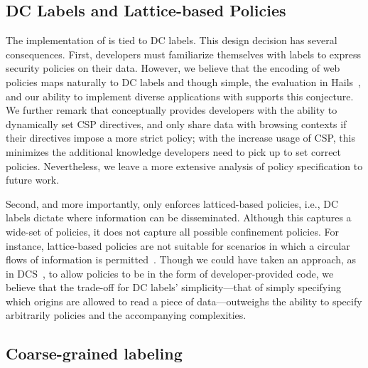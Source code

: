 
\subsection{DC Labels and Lattice-based Policies}

The implementation of \sys{} is tied to DC labels.
%
This design decision has several consequences.
%
First, developers must familiarize themselves with labels to express
security policies on their data.
%
However, we believe that the encoding of web policies maps naturally
to DC labels and though simple, the evaluation in
Hails~, and our ability to implement diverse
applications with \sys{} supports this conjecture.
%
We further remark that \sys{} conceptually provides developers with
the ability to dynamically set CSP directives, and only share data
with browsing contexts if their directives impose a more strict
policy; with the increase usage of CSP, this minimizes the additional
knowledge developers need to pick up to set correct policies.
%
Nevertheless, we leave a more extensive analysis of policy
specification to future work.
 
Second, and more importantly, \sys{} only enforces latticed-based
policies, i.e., DC labels dictate where information can be
disseminated.
%
Although this captures a wide-set of policies, it does not capture all
possible confinement policies.
%
For instance, lattice-based policies are not suitable for scenarios in
which a circular flows of information is permitted~\cite{Badger:1995}.
%
Though we could have taken an approach, as in DCS~\cite{Akhawe2013},
to allow policies to be in the form of developer-provided code, we
believe that the trade-off for DC labels' simplicity---that of simply
specifying which origins are allowed to read a piece of
data---outweighs the ability to specify arbitrarily policies and the
accompanying complexities.


\subsection{Coarse-grained labeling}

